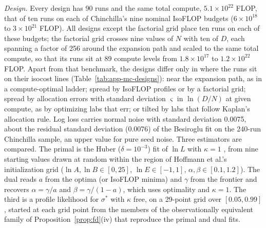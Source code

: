 \textit{Design.} Every design has 90 runs and the same total compute, $5.1\times10^{22}$ FLOP, that of ten runs on each of
Chinchilla's nine nominal IsoFLOP budgets ($6\times10^{18}$ to $3\times10^{21}$ FLOP). All designs except the factorial grid
place ten runs on each of these budgets; the factorial grid crosses nine values of $N$ with ten of $D$, each spanning a
factor of 256 around the expansion path and scaled to the same total compute, so that its runs sit at 89 compute levels
from $1.8\times10^{17}$ to $1.2\times10^{22}$ FLOP. Apart from that benchmark, the designs differ only in where the runs
sit on their isocost lines (Table~\ref{tab:app-mc-designs}): near the expansion path, as in a
compute-optimal ladder; spread by IsoFLOP profiles or by a factorial grid; spread by allocation errors with standard
deviation $\varsigma$ in $\ln(D/N)$ at given compute, as by optimizing labs that err; or tilted by labs that follow
Kaplan's allocation rule. Log loss carries normal noise with standard deviation 0.0075, about the residual standard
deviation (0.0076) of the Besiroglu fit on the 240-run Chinchilla sample, an upper value for pure seed noise. Three estimators are
compared. The primal is the Huber ($\delta=10^{-3}$) fit of $\ln L$ with $\kappa=1$
\citep{hoffmann2022training,besiroglu2024chinchilla}, from nine starting values drawn at random within the region of Hoffmann et al.'s
initialization grid ($\ln A,\ln B\in[0,25]$, $\ln E\in[-1,1]$, $\alpha,\beta\in[0.1,1.2]$). The dual reads $a$ from the optima (or IsoFLOP minima) and $\gamma$ from the frontier and recovers
$\alpha=\gamma/a$ and $\beta=\gamma/(1-a)$, which uses optimality and $\kappa=1$. The third is a profile likelihood for
$\sigma^*$ with $\kappa$ free, on a 29-point grid over $[0.05,0.99]$, started at each grid point from the members of the
observationally equivalent family of Proposition~\ref{prop:fd}(iv) that reproduce the primal and dual fits.

